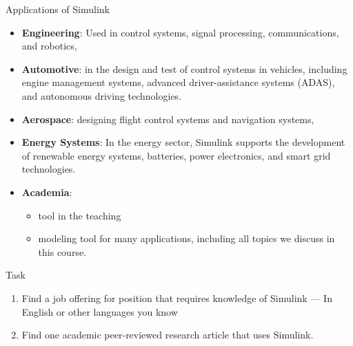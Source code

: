 \begin{frame}{Applications of Simulink}
  \begin{itemize}
    \item \textbf{Engineering}: Used  in control systems, signal processing, communications, and robotics,
    \item \textbf{Automotive}:  in the design and test of control systems in vehicles, including engine management systems, advanced driver-assistance systems (ADAS), and autonomous driving technologies.
    \item \textbf{Aerospace}: designing flight control systems and navigation systems,
    \item \textbf{Energy Systems}: In the energy sector, Simulink supports the development of renewable energy systems, batteries, power electronics, and smart grid technologies.
    \item \textbf{Academia}: 
    \begin{itemize}
        \item tool in the teaching 
        \item modeling tool for many applications, including all topics we discuss in this course.
    \end{itemize}
  \end{itemize}
\end{frame}

\begin{frame}{Task}
    \Large
    \begin{enumerate}
        \item Find a job offering for position that requires knowledge of Simulink --- In English or other languages you know
        \item Find one academic peer-reviewed research article that uses Simulink. 
    \end{enumerate}
     
\end{frame}



